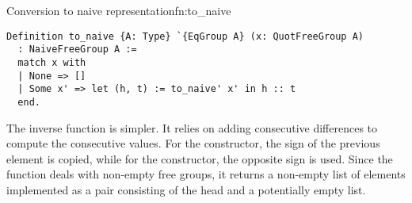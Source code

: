 \begin{func}{Conversion to naive representation}{fn:to_naive}
\begin{verbatim}
Definition to_naive {A: Type} `{EqGroup A} (x: QuotFreeGroup A) 
  : NaiveFreeGroup A :=
  match x with
  | None => []
  | Some x' => let (h, t) := to_naive' x' in h :: t
  end.
\end{verbatim}
\end{func}
The inverse function  is simpler. It relies on adding consecutive differences to compute the consecutive values. For the  constructor, the sign of the previous element is copied, while for the  constructor, the opposite sign is used. Since the  function deals with non-empty free groups, it returns a non-empty list of elements implemented as a pair consisting of the head and a potentially empty list.
